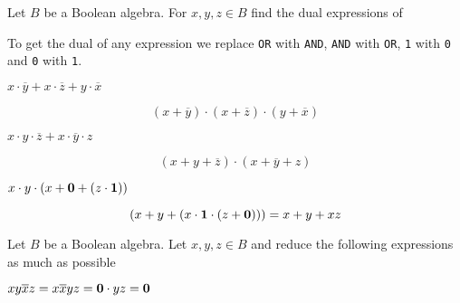 \documentclass[a4paper, english, 12pt]{article} %
\begin{document}
\titlebox

\begin{problem}[3]
  Let $B$ be a Boolean algebra. For $x,y,z \in B$ find the dual expressions of
\end{problem}

\begin{answer}
  To get the dual of any expression we replace \texttt{OR} with \texttt{AND},
  \texttt{AND} with \texttt{OR}, \texttt{1} with \texttt{0} and \texttt{0} with \texttt{1}.
\end{answer}

\begin{subsubproblem}
  $x \cdot \overline{y} + x \cdot \overline{z} + y \cdot \overline{x}$
\end{subsubproblem}

\begin{answer}
  \begin{equation*}
    (x + \overline{y}) \cdot (x + \overline{z}) \cdot (y + \overline{x})
  \end{equation*}
\end{answer}

\begin{subsubproblem}
  $x \cdot y \cdot \overline{z} + x \cdot \overline{y} \cdot z$
\end{subsubproblem}

\begin{answer}
  \begin{equation*}
    (x+y+\overline{z}) \cdot (x + \overline{y} + z)
  \end{equation*}
\end{answer}

\begin{subsubproblem}
    $x \cdot y \cdot (x + \textbf{0} + (z \cdot \textbf{1}))$
\end{subsubproblem}

\begin{answer}
  \begin{equation*}
    (x + y + (x \cdot \textbf{1} \cdot (z + \textbf{0})))
    = x + y + xz
  \end{equation*}
\end{answer}

\begin{problem}
  Let $B$ be a Boolean algebra. Let $x,y,z \in B$ and reduce the following
  expressions as much as possible
\end{problem}

\begin{subsubproblem}
  $xy\overline{x}z \ans{= x\overline{x}yz = \0 \cdot yz = \0}$
\end{subsubproblem}
\end{document}
